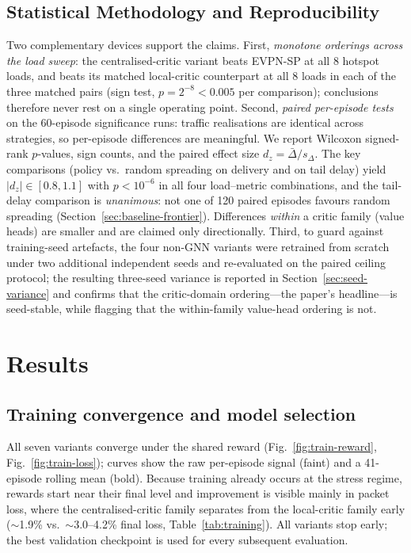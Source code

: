 \documentclass[10pt,journal,comsoc]{IEEEtran}
\begin{document}
\subsection{Statistical Methodology and Reproducibility}
\label{subsec:stats}
Two complementary devices support the claims. First, \emph{monotone orderings across the load sweep}: the centralised-critic variant beats EVPN-SP at all 8 hotspot loads, and beats its matched local-critic counterpart at all 8 loads in each of the three matched pairs (sign test, $p = 2^{-8} < 0.005$ per comparison); conclusions therefore never rest on a single operating point. Second, \emph{paired per-episode tests} on the 60-episode significance runs: traffic realisations are identical across strategies, so per-episode differences are meaningful. We report Wilcoxon signed-rank $p$-values, sign counts, and the paired effect size $d_z = \bar{\Delta}/s_\Delta$. The key comparisons (policy vs.\ random spreading on delivery and on tail delay) yield $|d_z| \in [0.8, 1.1]$ with $p < 10^{-6}$ in all four load--metric combinations, and the tail-delay comparison is \emph{unanimous}: not one of 120 paired episodes favours random spreading (Section~\ref{sec:baseline-frontier}). Differences \emph{within} a critic family (value heads) are smaller and are claimed only directionally. Third, to guard against training-seed artefacts, the four non-GNN variants were retrained from scratch under two additional independent seeds and re-evaluated on the paired ceiling protocol; the resulting three-seed variance is reported in Section~\ref{sec:seed-variance} and confirms that the critic-domain ordering---the paper's headline---is seed-stable, while flagging that the within-family value-head ordering is not.

\section{Results} \label{sec:results}

\subsection{Training convergence and model selection}
\label{sec:training}
All seven variants converge under the shared reward (Fig.~\ref{fig:train-reward}, Fig.~\ref{fig:train-loss}); curves show the raw per-episode signal (faint) and a 41-episode rolling mean (bold). Because training already occurs at the stress regime, rewards start near their final level and improvement is visible mainly in packet loss, where the centralised-critic family separates from the local-critic family early ($\sim$1.9\% vs.\ $\sim$3.0--4.2\% final loss, Table~\ref{tab:training}). All variants stop early; the best validation checkpoint is used for every subsequent evaluation.
\end{document}

